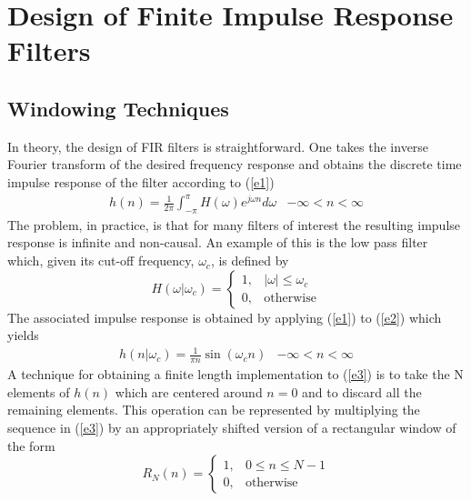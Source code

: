 \chapter[FIR Filters]{Design of Finite Impulse Response Filters}
\label{fir}
\section{Windowing Techniques} 
\label{s1}

In theory,  the design of FIR filters is straightforward.
One takes the inverse Fourier transform of the desired frequency response
and obtains the discrete time impulse response of the
filter according to (\ref{e1})
%
\begin{equation}
\begin{array}{cc}
h(n)=\frac{1}{2\pi}\int_{-\pi}^{\pi}H(\omega)e^{j\omega n}d\omega 
&  -\infty<n<\infty
\end{array}
\label{e1}
\end{equation}
%
The problem, in practice, is that for many filters of interest
the resulting impulse response is infinite and non-causal.
An example of this is the low pass filter which, given its cut-off
frequency, $\omega_c$,  is defined by
%
\begin{equation}
H(\omega|\omega_c)=\left\{ \begin{array}{ll}
                     1, & \mbox{$|\omega|\leq\omega_c$}\\
                     0, & \mbox{otherwise}
                \end{array}
       \right.
\label{e2}
\end{equation}
%
The associated impulse response is obtained by applying (\ref{e1}) to 
(\ref{e2})
which yields
%
\begin{equation}
\begin{array}{cc}
h(n|\omega_c)=\frac{1}{\pi n}\sin(\omega_cn) &   -\infty<n<\infty
\end{array}
\label{e3}
\end{equation}
%
A technique for obtaining a finite length
implementation to (\ref{e3}) is to take the N elements of
$h(n)$ which are centered around $n=0$ and to discard 
all the remaining elements.  This operation can
be represented by multiplying the sequence in (\ref{e3}) by an 
appropriately shifted version of a rectangular window of the form
%
\begin{equation}
R_N(n)=\left\{ \begin{array}{ll}
                     1, & \mbox{$0 \leq n \leq N-1$}\\
                     0, & \mbox{otherwise}
                \end{array}
       \right.
\label{e4}
\end{equation}
%

